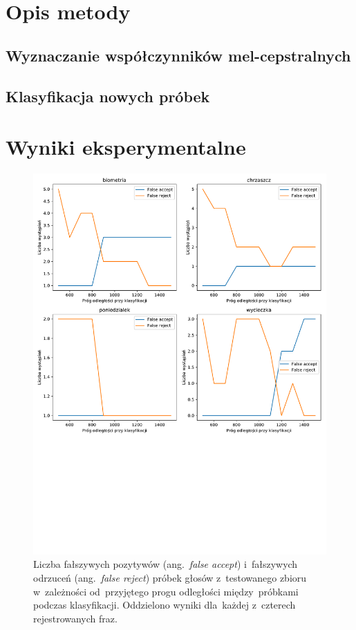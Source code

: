 \documentclass[11pt,a4paper]{article}
\begin{document}
\section{Opis metody}
\label{sec:method}

\subsection{Wyznaczanie współczynników mel-cepstralnych}

\subsection{Klasyfikacja nowych próbek}
\label{subsec:classification}

\section{Wyniki eksperymentalne}
\label{sec:results}

\begin{figure}
    \centering
    \includegraphics[width=\textwidth]{res/plots/acceptance_rates.pdf}
    \caption{Liczba fałszywych pozytywów (ang.~\emph{false accept}) i~fałszywych odrzuceń (ang.~\emph{false reject}) próbek głosów z~testowanego zbioru w~zależności od~przyjętego progu odległości między~próbkami podczas klasyfikacji.
    Oddzielono wyniki dla~każdej z~czterech rejestrowanych fraz.}
    \label{fig:acceptance-rates}
\end{figure}
\end{document}
